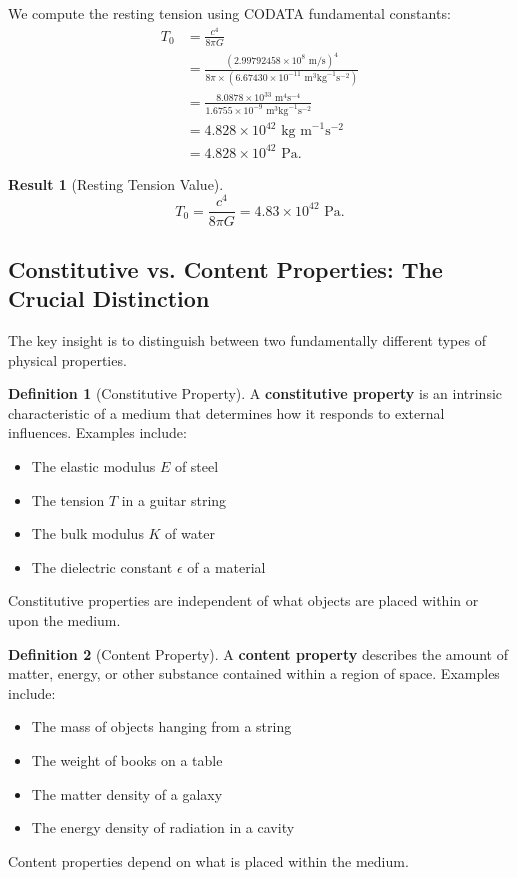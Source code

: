 \documentclass[11pt,a4paper]{article}
\newcommand{\ee}[1]{\times 10^{#1}}
\newcommand{\Tzero}{\ensuremath{T_0}}
\theoremstyle{definition}
\newtheorem{definition}{Definition}
\newtheorem{result}{Result}
\begin{document}
We compute the resting tension using CODATA fundamental constants:
\begin{align}
\Tzero &= \frac{c^4}{8\pi G} \nonumber \\[1ex]
&= \frac{(2.99792458 \ee{8} \text{ m/s})^4}{8\pi \times (6.67430 \ee{-11} \text{ m}^3\text{kg}^{-1}\text{s}^{-2})} \nonumber \\[1ex]
&= \frac{8.0878 \ee{33} \text{ m}^4\text{s}^{-4}}{1.6755 \ee{-9} \text{ m}^3\text{kg}^{-1}\text{s}^{-2}} \nonumber \\[1ex]
&= 4.828 \ee{42} \text{ kg m}^{-1}\text{s}^{-2} \nonumber \\[1ex]
&= 4.828 \ee{42} \text{ Pa}.
\end{align}

\begin{result}[Resting Tension Value]
\begin{equation}
\label{eq:T0_value}
\boxed{\Tzero = \frac{c^4}{8\pi G} = 4.83 \times 10^{42} \text{ Pa}.}
\end{equation}
\end{result}

\subsection{Constitutive vs. Content Properties: The Crucial Distinction}
\label{sec:constitutive_vs_content}

The key insight is to distinguish between two fundamentally different types of physical properties.

\begin{definition}[Constitutive Property]
A \textbf{constitutive property} is an intrinsic characteristic of a medium that determines how it responds to external influences. Examples include:
\begin{itemize}
    \item The elastic modulus $E$ of steel
    \item The tension $T$ in a guitar string
    \item The bulk modulus $K$ of water
    \item The dielectric constant $\epsilon$ of a material
\end{itemize}
Constitutive properties are independent of what objects are placed within or upon the medium.
\end{definition}

\begin{definition}[Content Property]
A \textbf{content property} describes the amount of matter, energy, or other substance contained within a region of space. Examples include:
\begin{itemize}
    \item The mass of objects hanging from a string
    \item The weight of books on a table
    \item The matter density of a galaxy
    \item The energy density of radiation in a cavity
\end{itemize}
Content properties depend on what is placed within the medium.
\end{definition}
\end{document}

